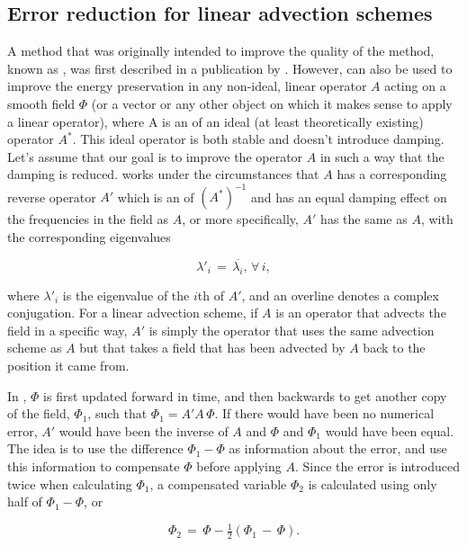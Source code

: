 \subsection{Error reduction for linear advection schemes}

A method that was originally intended to improve the quality of the \LS method, known as \BFECC, was first described in a publication by \citet{Dupont2003}. However, \BFECC can also be used to improve the energy preservation in any non-ideal, linear operator $A$ acting on a smooth field $\Phi$ (or a vector or any other object on which it makes sense to apply a linear operator), where A is an \approximation of an ideal (at least theoretically existing) operator $A^*$. This ideal operator is both stable and doesn't introduce damping. Let's assume that our goal is to improve the operator $A$ in such a way that the damping is reduced. \BFECC works under the circumstances that $A$ has a corresponding reverse operator $A'$ which is an \approximation of $(A^*)^{-1}$ and has an equal damping effect on the frequencies in the field as $A$, or more specifically, $A'$ has the same \eigenfunctions as $A$, with the corresponding eigenvalues

\begin{equation}
\lambda'_i \,=\, \overline{\lambda_i}, \,\forall\,i,
\end{equation}

where $\lambda'_i$ is the eigenvalue of the $i$th \eigenfunction of $A'$, and an overline denotes a complex conjugation. For a linear advection scheme, if $A$ is an operator that advects the field in a specific way, $A'$ is simply the operator that uses the same advection scheme as $A$ but that takes a field that has been advected by $A$ back to the position it came from.

In \BFECC, $\Phi$ is first updated forward in time, and then backwards to get another copy of the field, $\Phi_1$, such that $\Phi_1 = A'A\,\Phi$. If there would have been no numerical error, $A'$ would have been the inverse of $A$ and $\Phi$ and $\Phi_1$ would have been equal. The idea is to use the difference $\Phi_1-\Phi$ as information about the error, and use this information to compensate $\Phi$ before applying $A$. Since the error is introduced twice when calculating $\Phi_1$, a compensated variable $\Phi_2$ is calculated using only half of $\Phi_1-\Phi$, or

\begin{equation}
\Phi_2 \,=\, \Phi - \tfrac{1}{2}(\Phi_1 \,-\, \Phi).
\end{equation}

